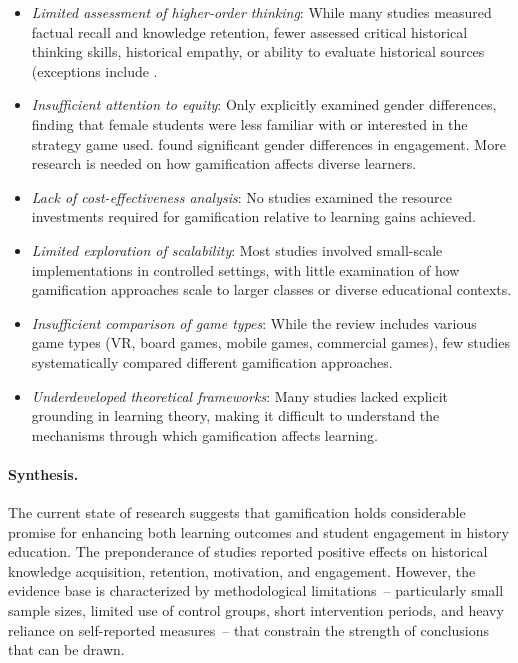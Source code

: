 \documentclass[a4paper,fleqn]{cas-sc}
\begin{document}
\begin{itemize}[noitemsep]
 \item \textit{Limited assessment of higher-order thinking}: While many studies measured factual recall and knowledge retention, fewer assessed critical historical thinking skills, historical empathy, or ability to evaluate historical sources (exceptions include \citep{3Watson2011466, 12Gilbert2019108, 54Gibson2007, 71lynch2015pedagogical}.
 
 \item \textit{Insufficient attention to equity}: Only \citet{8Yu2014} explicitly examined gender differences, finding that female students were less familiar with or interested in the strategy game used. \citet{66Rahmawati2023163} found significant gender differences in engagement. More research is needed on how gamification affects diverse learners.
 
 \item \textit{Lack of cost-effectiveness analysis}: No studies examined the resource investments required for gamification relative to learning gains achieved.
 
 \item \textit{Limited exploration of scalability}: Most studies involved small-scale implementations in controlled settings, with little examination of how gamification approaches scale to larger classes or diverse educational contexts.
 
 \item \textit{Insufficient comparison of game types}: While the review includes various game types (VR, board games, mobile games, commercial games), few studies systematically compared different gamification approaches.
 
 \item \textit{Underdeveloped theoretical frameworks}: Many studies lacked explicit grounding in learning theory, making it difficult to understand the mechanisms through which gamification affects learning.
\end{itemize}

\paragraph{Synthesis.}

The current state of research suggests that gamification holds considerable promise for enhancing both learning outcomes and student engagement in history education. The preponderance of studies reported positive effects on historical knowledge acquisition, retention, motivation, and engagement. However, the evidence base is characterized by methodological limitations~-- particularly small sample sizes, limited use of control groups, short intervention periods, and heavy reliance on self-reported measures~-- that constrain the strength of conclusions that can be drawn. 
\end{document}
